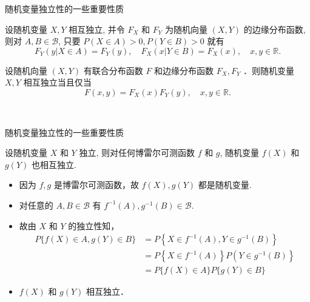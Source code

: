 \documentclass[Prob-All.tex]{subfiles}
\begin{document}
\begin{frame}{随机变量独立性的一些重要性质}
\begin{thm}
设随机变量 $X, Y$ 相互独立, 并令 $F_{X}$ 和 $F_{Y}$ 为随机向量 $(X, Y)$ 的边缘分布函数, 则对 $A, B \in \mathcal{B}$, 只要 $P(X \in A)>0, P(Y \in B)>0$ 就有
$$
F_{Y}(y | X \in A)=F_{Y}(y), \quad F_{X}(x | Y \in B)=F_{X}(x), \quad x, y\in \mathbb{R}.$$
\end{thm}%
\vspace{-0.7cm}

\pause
\begin{thm}
 设随机向量 $(X, Y)$ 有联合分布函数 $F$ 和边缘分布函数 $F_{X}, F_{Y}$ ．则随机变量 $X, Y$ 相互独立当且仅当
$$
F(x, y)=F_{X}(x) F_{Y}(y), \quad  x, y \in \mathbb{R}.$$
\end{thm}%
\
\end{frame}
\begin{frame}{随机变量独立性的一些重要性质}

\vspace{-0.7cm}
\begin{thm} 设随机变量 $X$ 和 $Y$ 独立, 则对任何博雷尔可测函数 $f$ 和 $g$, 随机变量 $f(X)$ 和 $g(Y)$ 也相互独立.
\end{thm}%

\zheng \begin{itemize}[<+-|alert@+>]
\item 因为 \( f, g \) 是博雷尔可测函数，故 \( f(X), g(Y) \) 都是随机变量.
\item 对任意的 \( A, B \in \mathcal{B} \) 有 \( f^{-1}(A), g^{-1}(B) \in \mathcal{B} \).
\item 故由 \( X \) 和 \( Y \) 的独立性知，
\[
\begin{aligned}
P\{f(X) \in A, g(Y) \in B\}  &=P\left\{X \in f^{-1}(A), Y \in g^{-1}(B)\right\} \\
& =P\left\{X \in f^{-1}(A)\right\} P\left(Y \in g^{-1}(B)\right\}  \\
&=P\{f(X) \in A\} P\{g(Y) \in B\}
\end{aligned}
\]
\item \( f(X) \) 和 \( g(Y) \) 相互独立．
\end{itemize}

\end{frame}
\end{document}
